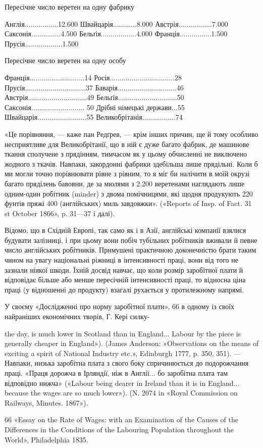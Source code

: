 Пересічне число веретен на одну фабрику

Англія.................12.600
Швайцарія............8.000
Австрія.................7.000
Саксонія...............4.500
Бельґія..................4.000
Франція................1.500
Прусія...................1.500

Пересічне число веретен на одну особу

Франція............................14
Росія.................................28
Прусія...............................37
Баварія..............................46
Австрія..............................49
Бельґія..............................50
Саксонія........................... 50
Дрібні німецькі держави...55
Швайцарія.........................55
Великобрітанія.................74

«Це порівняння, — каже пан Редґрев, — крім інших причин, ще й тому особливо несприятливе для
Великобрітанії, що в ній є дуже багато фабрик, де машинове ткання сполучене з прядінням, тимчасом як
у цьому обчисленні не виключено жодного з ткачів. Навпаки, закордонні фабрики здебільша лише
прядільні. Коли б ми могли точно порівнювати рівне з рівним, то я міг би налічити в моїй окрузі
багато пряділень бавовни, де за мюлями з 2.200 веретенами наглядають лише одним-один робітник
(minder) з двома помічницями, які щодня продукують 220 фунтів пряжі 400 (англійських) миль
завдовжки». («Reports of Insp. of Fact. 31 st October 1866», p. 31—37 і далі).

Відомо, що в Східній Европі, так само як і в Азії, англійські компанії взялися будувати залізниці, і
при цьому вони побіч тубільних робітників вживали й певне число англійських робітників. Примушені
практичною доконечністю брати таким чином
на увагу національні ріжниці в інтенсивності праці, вони від того не зазнали ніякої шкоди. Їхній
досвід навчає, що коли розмір заробітної плати й відповідає більше або менше пересічній
інтенсивності праці, то відносна ціна праці (у відношенні до продукту) взагалі рухається у
протилежному напрямі.

У своєму «Дослідженні про норму заробітної плати», 66 в одному із своїх найраніших економічних
творів, Г. Кері силку-

the day, is much lower in Scotland than in England... Labour by the piece
is generally cheaper in England»). (James Anderson: «Observations on
the means of exciting a spirit of National Industry etc.», Edinburgh 1777,
p. 350, 351). — Навпаки, низька заробітна плата з свого боку спричинюється
до подорожчання праці. «Праця дорожча в Ірляндії, ніж в Англії...
бо заробітна плата там відповідно нижча» («Labour being dearer in Ireland
than it is in England... because the wages are so much lower»).
(N. 2074 in «Royal Commission on Railways, Minutes. 1867»).

66 «Essay on the Rate of Wages: with an Examination of the Causes
of the Differences in the Conditions of the Labouring Population throughout
the World», Philadelphia 1835.
